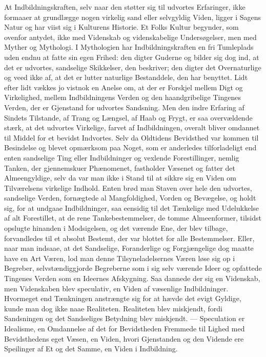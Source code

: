 \documentclass[12pt]{book}
\newcommand{\apage}[1]{\marginnote{\footnotesize\textit{[#1]}}}
\begin{document}
At Indbildningskraften, selv naar den støtter sig til udvortes Erfaringer,
ikke formaaer at grundlægge \apage{26} nogen virkelig sand eller selvgyldig Viden,
ligger i Sagens Natur og har viist sig i Kulturens Historie. Et Folks
Kultur begynder, som ovenfor antydet, ikke med Videnskab og videnskabelige
Undersøgelser, men med Myther og Mythologi. I Mythologien har
Indbildningskraften en fri Tumleplads uden endnu at fatte sin egen Frihed:
den digter Guderne og bilder sig dog ind, at det er udvortes, sandselige
Skikkelser, den beskriver; den digter det Overnaturlige og veed ikke af,
at det er lutter naturlige Bestanddele, den har benyttet. Lidt efter lidt
vækkes jo vistnok en Anelse om, at der er Forskjel mellem Digt og
Virkelighed, mellem Indbildningens Verden og den haandgribelige Tingenes
Verden, der er Gjenstand for udvortes Sandsning. Men den indre Erfaring af
Sindets Tilstande, af Trang og Længsel, af Haab og Frygt, er saa
overvældende stærk, at det udvortes Virkelige, farvet af Indbildningen,
overalt bliver omdannet til Middel for et bevidst Indvortes. Selv da
Oldtidens Bevidsthed var kommen til Besindelse og blevet opmærksom paa
Noget, som er anderledes tilforladeligt end enten sandselige Ting eller
Indbildninger og vexlende Forestillinger, nemlig Tanken, der gjennemskuer
Phænomenet, fastholder Væsenet og fatter det Almeengyldige, selv da var
man ikke i Stand til at sikkre sig en Viden om Tilværelsens virkelige
Indhold. Enten brød man Staven over hele den udvortes, sandselige Verden,
fornægtede al Mangfoldighed, Vorden og Bevægelse, og holdt sig, for at
undgaae Indbildninger, saa eensidig til det Tænkelige med Udelukkelse af
alt Forestillet, at \apage{27} de rene Tankebestemmelser, de tomme Almeenformer,
tilsidst opslugte hinanden i Modsigelsen, og det værende Ene, der blev
tilbage, forvandledes til et absolut Bestemt, der var blottet for alle
Bestemmelser. Eller, naar man indsaae, at det Sandselige, Foranderlige og
Forgjængelige dog maatte have en Art Væren, lod man denne
Tilsyneladelsernes Væren løse sig op i Begreber, selvstændiggjorde
Begreberne som i sig selv værende Ideer og opfattede Tingenes Verden som
en Ideernes Afskygning. Saa dannede der sig en Videnskab, men Videnskaben
blev speculativ, en Viden af væsenlige Indbildninger. Hvormeget end
Tænkningen anstrængte sig for at hævde det evigt Gyldige, kunde man dog
ikke naae Realiteten. Realiteten blev miskjendt, fordi Sandsningen og det
Sandseliges Betydning blev miskjendt. --- Speculation er Idealisme, en
Omdannelse af det for Bevidstheden Fremmede til Lighed med Bevidsthedens
eget Væsen, en Viden, hvori Gjenstanden og den Vidende ere Speilinger af
Et og det Samme, en Viden i Indbildning.
\end{document}
